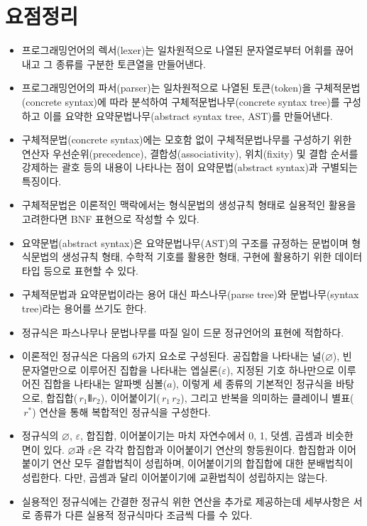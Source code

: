 \section*{요점정리}
\begin{itemize}[itemsep=0pt]
\item 프로그래밍언어의 렉서(lexer)는 일차원적으로 나열된 문자열로부터
      어휘를 끊어내고 그 종류를 구분한 토큰열을 만들어낸다.
\item 프로그래밍언어의 파서(parser)는 일차원적으로 나열된
      토큰(token)을 구체적문법(concrete syntax)에 따라 분석하여
      구체적문법나무(concrete syntax tree)를 구성하고 이를 요약한
      요약문법나무(abstract syntax tree, AST)를 만들어낸다.
\item 구체적문법(concrete syntax)에는 모호함 없이 구체적문법나무를
      구성하기 위한 연산자 우선순위(precedence), 결합성(associativity),
      위치(fixity) 및 결합 순서를 강제하는 괄호 등의 내용이 나타나는
      점이 요약문법(abstract syntax)과 구별되는 특징이다.
\item 구체적문법은 이론적인 맥락에서는 형식문법의 생성규칙 형태로
      실용적인 활용을 고려한다면 BNF 표현으로 작성할 수 있다.
\item 요약문법(abstract syntax)은 요약문법나무(AST)의 구조를 규정하는
      문법이며 형식문법의 생성규칙 형태, 수학적 기호를 활용한 형태,
      구현에 활용하기 위한 데이터 타입 등으로 표현할 수 있다.
\item 구체적문법과 요약문법이라는 용어 대신 파스나무(parse tree)와
      문법나무(syntax tree)라는 용어를 쓰기도 한다.
\item 정규식은 파스나무나 문법나무를 따질 일이 드문 정규언어의 표현에 적합하다.
\item 이론적인 정규식은 다음의 6가지 요소로 구성된다.
      공집합을 나타내는 널($\varnothing$),
      빈 문자열만으로 이루어진 집합을 나타내는 엡실론($\varepsilon$),
      지정된 기호 하나만으로 이루어진 집합을 나타내는 알파벳 심볼($a$),
      이렇게 세 종류의 기본적인 정규식을 바탕으로, 합집합($\,r_1 \VERT r_2$),
      이어붙이기($\,r_1\,r_2$), 그리고 반복을 의미하는 클레이니 별표($\,r^{*}$) 연산을
      통해 복합적인 정규식을 구성한다.
\item 정규식의 $\varnothing$, $\varepsilon$, 합집합, 이어붙이기는 마치 자연수에서
      0, 1, 덧셈, 곱셈과 비슷한 면이 있다. $\varnothing$과 $\varepsilon$은
      각각 합집합과 이어붙이기 연산의 항등원이다. 합집합과 이어붙이기 연산
      모두 결합법칙이 성립하며, 이어붙이기의 합집합에 대한 분배법칙이 성립한다.
      다만, 곱셈과 달리 이어붙이기에 교환법칙이 성립하지는 않는다.
\item 실용적인 정규식에는 간결한 정규식 위한 연산을 추가로 제공하는데
      세부사항은 서로 종류가 다른 실용적 정규식마다 조금씩 다를 수 있다. 
\end{itemize}



